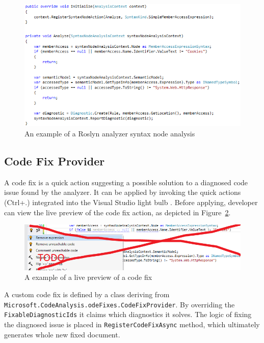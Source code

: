 \documentclass[
  digital, %
  table,   %
  lof,     %
  lot,     %
  oneside,
]{fithesis3}
\begin{document}
\begin{figure}[h!]
		\centering
			\includegraphics[scale=0.73]{img/analyzer-example}
		\caption{An example of a Roslyn analyzer syntax node analysis}
		\label{fig:analyzer-example}
\end{figure}

\subsection{Code Fix Provider}
A code fix is a quick action suggesting a possible solution to a diagnosed code issue found by the analyzer. It can be applied by invoking the quick actions (Ctrl+.) integrated into the Visual Studio light bulb . Before applying, developer can view the live preview of the code fix action, as depicted in Figure~\ref{fig:codefix-example}.

\begin{figure}[h!]
		\centering
			\includegraphics[scale=0.65]{img/codefix-example}
		\caption{A example of a live preview of a code fix}
		\label{fig:codefix-example}
\end{figure}

A custom code fix is defined by a class deriving from \texttt{Microsoft.CodeAnalysis.odeFixes.CodeFixProvider}. By overriding the \texttt{FixableDiagnosticIds} it claims which diagnostics it solves. The logic of fixing the diagnosed issue is placed in \texttt{RegisterCodeFixAsync} method, which ultimately generates whole new fixed document.
\end{document}
